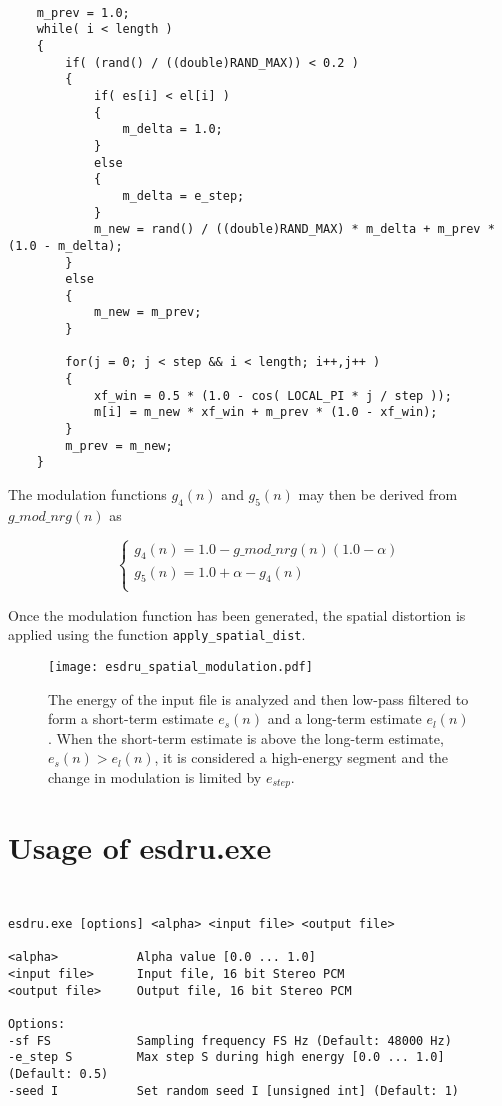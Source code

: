 {\tt\small
\begin{verbatim}
    m_prev = 1.0;
    while( i < length )    
    {
        if( (rand() / ((double)RAND_MAX)) < 0.2 )
        { 
            if( es[i] < el[i] )
            {
                m_delta = 1.0;
            }
            else
            {
                m_delta = e_step;
            }
            m_new = rand() / ((double)RAND_MAX) * m_delta + m_prev * (1.0 - m_delta);
        }
        else
        {
            m_new = m_prev;
        }

        for(j = 0; j < step && i < length; i++,j++ )
        {
            xf_win = 0.5 * (1.0 - cos( LOCAL_PI * j / step ));
            m[i] = m_new * xf_win + m_prev * (1.0 - xf_win);
        }
        m_prev = m_new;
    }
\end{verbatim}
}    
    
The modulation functions $g_4(n)$ and $g_5(n)$ may then be derived from $g\_mod\_nrg(n)$ as 

  \[
    \left\{
       \begin{array}{ll}
            g_4(n) = 1.0 - g\_mod\_nrg(n) (1.0 - \alpha) \\
            g_5(n) = 1.0 + \alpha - g_4(n)               \\
       \end{array}
     \right.
  \]
  
Once the modulation function has been generated, the spatial distortion is applied using the 
function \texttt{apply\_spatial\_dist}.


\begin{figure}[htp]
    \begin{center}
        \texttt{[image: esdru\_spatial\_modulation.pdf]}
  \end{center}
  \caption{The energy of the input file is analyzed and then low-pass filtered to form a 
           short-term estimate $e_s(n)$ and a long-term estimate $e_l(n)$. When the short-term  
           estimate is above the long-term estimate, $e_s(n)>e_l(n)$, it is considered a high-energy
           segment and the change in modulation is limited by $e_{step}$.
           \label{fig:esdru_spatial_modulation} }
\end{figure}



\section{Usage of esdru.exe}

{\tt\small
\begin{verbatim}
esdru.exe [options] <alpha> <input file> <output file>

<alpha>           Alpha value [0.0 ... 1.0]
<input file>      Input file, 16 bit Stereo PCM
<output file>     Output file, 16 bit Stereo PCM

Options:
-sf FS            Sampling frequency FS Hz (Default: 48000 Hz)
-e_step S         Max step S during high energy [0.0 ... 1.0] (Default: 0.5)
-seed I           Set random seed I [unsigned int] (Default: 1)
\end{verbatim}
}
